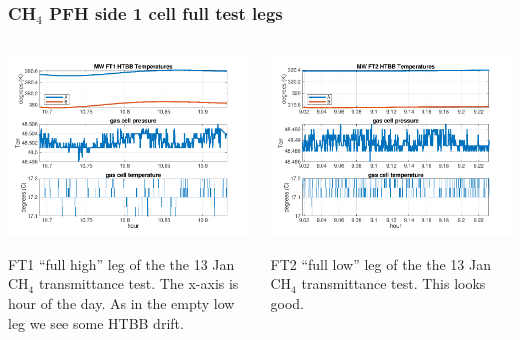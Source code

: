 \documentclass[10pt]{beamer}
\begin{document}
\begin{frame}
\frametitle{CH$_4$ PFH side 1 cell full test legs}
\begin{columns}[t]
\begin{column}{0.5\textwidth}
  \begin{centering}
  \includegraphics[width=\textwidth]{harvest_01-12/01-13_MW_FT1.png}
  \end{centering}\vspace{3mm}

  FT1 ``full high'' leg of the the 13 Jan CH$_4$ transmittance test.
  The x-axis is hour of the day.  As in the empty low leg we see
  some HTBB drift.

\end{column}
\begin{column}{0.5\textwidth}  
  \begin{centering}
  \includegraphics[width=\textwidth]{harvest_01-12/01-13_MW_FT2.png}
  \end{centering}\vspace{3mm}

  FT2 ``full low'' leg of the the 13 Jan CH$_4$ transmittance test.
  This looks good.

\end{column}
\end{columns}
\end{frame}
\end{document}
